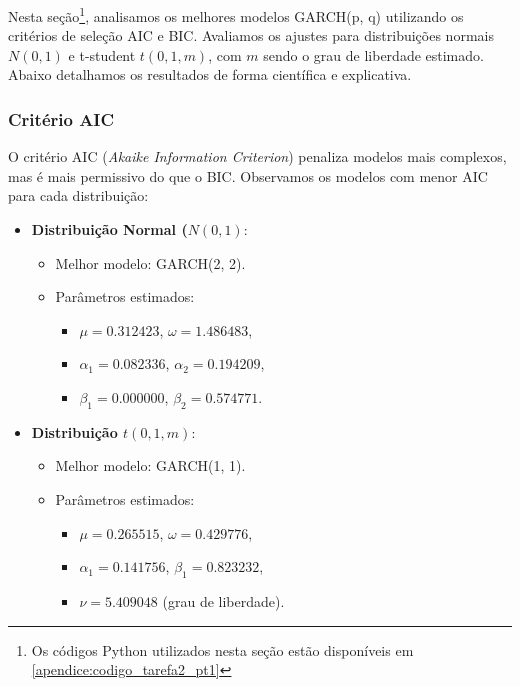 \documentclass[a4paper, 12pt]{article}
\begin{document}
Nesta seção\footnote{Os códigos Python utilizados nesta seção estão disponíveis em \ref{apendice:codigo_tarefa2_pt1}}, analisamos os melhores modelos GARCH(p, q) utilizando os critérios de seleção AIC e BIC. Avaliamos os ajustes para distribuições normais \(N(0,1)\) e t-student \(t(0,1,m)\), com \(m\) sendo o grau de liberdade estimado. Abaixo detalhamos os resultados de forma científica e explicativa.

\subsubsection{Critério AIC}

O critério AIC (\textit{Akaike Information Criterion}) penaliza modelos mais complexos, mas é mais permissivo do que o BIC. Observamos os modelos com menor AIC para cada distribuição:

\begin{itemize}
    \item \textbf{Distribuição Normal (\(N(0,1)\)}:
        \begin{itemize}
            \item Melhor modelo: GARCH(2, 2).
            \item Parâmetros estimados:
            \begin{itemize}
                \item \(\mu = 0.312423\), \(\omega = 1.486483\),
                \item \(\alpha_1 = 0.082336\), \(\alpha_2 = 0.194209\),
                \item \(\beta_1 = 0.000000\), \(\beta_2 = 0.574771\).
            \end{itemize}
        \end{itemize}
    \item \textbf{Distribuição \(t(0,1,m)\)}:
        \begin{itemize}
            \item Melhor modelo: GARCH(1, 1).
            \item Parâmetros estimados:
            \begin{itemize}
                \item \(\mu = 0.265515\), \(\omega = 0.429776\),
                \item \(\alpha_1 = 0.141756\), \(\beta_1 = 0.823232\),
                \item \(\nu = 5.409048\) (grau de liberdade).
            \end{itemize}
        \end{itemize}
\end{itemize}
\end{document}
